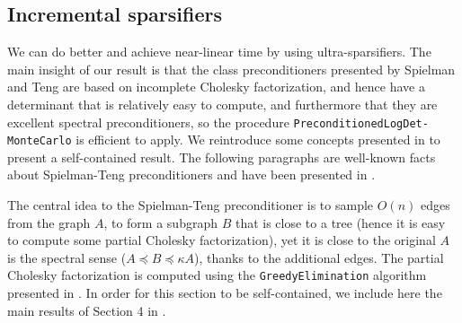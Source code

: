 
\subsection{Incremental sparsifiers\label{sec:Incremental-sparsifiers}}

We can do better and achieve near-linear time by using ultra-sparsifiers.
The main insight of our result is that the class preconditioners presented
by Spielman and Teng are based on incomplete Cholesky factorization,
and hence have a determinant that is relatively easy to compute, and
furthermore that they are excellent spectral preconditioners, so the
procedure \texttt{PreconditionedLogDet- MonteCarlo} is efficient to
apply. We reintroduce some concepts presented in \cite{Koutis2010}
to present a self-contained result. The following paragraphs are well-known
facts about Spielman-Teng preconditioners and have been presented
in \cite{Koutis2010,Spielman2009a}.

The central idea to the Spielman-Teng preconditioner is to sample
$O\left(n\right)$ edges from the graph $A$, to form a subgraph $B$
that is close to a tree (hence it is easy to compute some partial
Cholesky factorization), yet it is close to the original $A$ is the
spectral sense ($A\preceq B\preceq\kappa A$), thanks to the additional
edges. The partial Cholesky factorization is computed using the \texttt{GreedyElimination}
algorithm presented in \cite{Koutis2010}. In order for this section
to be self-contained, we include here the main results of Section
4 in \cite{Spielman2009a}.

